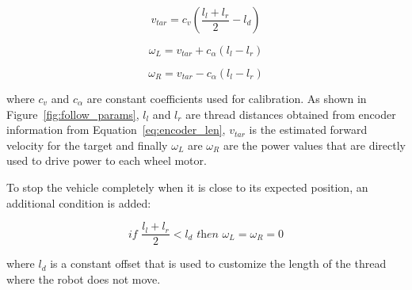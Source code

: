 \documentclass[journal]{IEEEtran}
\begin{document}
\begin{equation}
v_{tar} = c_v (\frac{l_l + l_r}{2} - l_d)
\label{eq:lemniscata}
\end{equation}

\begin{equation}
\omega_{L} = v_{tar} + c_{\alpha} (l_l - l_r)
\label{eq:lemniscata2}
\end{equation}

\begin{equation}
\omega_{R} = v_{tar} - c_{\alpha} (l_l - l_r)
\label{eq:lemniscata3}
\end{equation}

\noindent where  $c_v$ and $c_{\alpha}$ are constant coefficients used for calibration.  As shown in Figure~\ref{fig:follow_params},  $l_l$ and $l_r$ are thread distances obtained from encoder information from Equation~\ref{eq:encoder_len}, $v_{tar}$ is the estimated forward velocity for the target and finally $\omega_{L}$ are $\omega_{R}$ are the power values that are directly used to drive power to each wheel motor.

To stop the vehicle completely when it is close to its expected position, an additional condition is added: 

\begin{equation}
\textit{if  }{\frac{l_l + l_r}{2} < l_d}\textit{ then } \omega_{L} = \omega_{R} = 0 
\end{equation}

\noindent where $l_d$ is a constant offset that is used to customize the length of the thread where the robot does not move.
\end{document}
